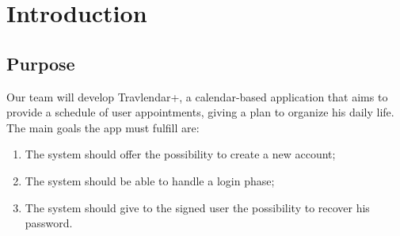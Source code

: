\chapter{Introduction}

\section{Purpose}

Our team will develop Travlendar+, a calendar-based application that aims to provide a schedule of user appointments, giving a plan to organize his daily life.
The main goals the app must fulfill are:

\begin{enumerate}
\renewcommand\labelenumi{\textbf{G\theenumi}}

\item The system should offer the possibility to create a new account;
\label{goal:G5}

\item The system should be able to handle a login phase;
\label{goal:G6}

\item The system should give to the signed user the possibility to recover his password.
\label{G9}


\end{enumerate}
